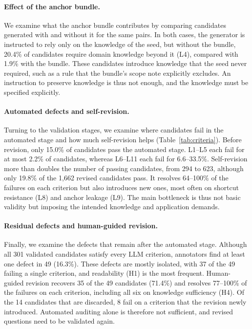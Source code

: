 

\paragraph{Effect of the anchor bundle.}
We examine what the anchor bundle contributes by comparing candidates generated with and without it for the same pairs.
In both cases, the generator is instructed to rely only on the knowledge of the seed, but without the bundle, 20.4\% of candidates require domain knowledge beyond it (L4), compared with 1.9\% with the bundle.
These candidates introduce knowledge that the seed never required, such as a rule that the bundle's scope note explicitly excludes.
An instruction to preserve knowledge is thus not enough, and the knowledge must be specified explicitly.

\paragraph{Automated defects and self-revision.}
Turning to the validation stages, we examine where candidates fail in the automated stage and how much self-revision helps (Table~\ref{tab:criteria}).
Before revision, only 15.0\% of candidates pass the automated stage.
L1--L5 each fail for at most 2.2\% of candidates, whereas L6--L11 each fail for 6.6--33.5\%. 
Self-revision more than doubles the number of passing candidates, from 294 to 623, although only 19.8\% of the 1,662 revised candidates pass.
It resolves 64--100\% of the failures on each criterion but also introduces new ones, most often on shortcut resistance (L8) and anchor leakage (L9).
The main bottleneck is thus not basic validity but imposing the intended knowledge and application demands.

\paragraph{Residual defects and human-guided revision.}
Finally, we examine the defects that remain after the automated stage.
Although all 301 validated candidates satisfy every LLM criterion, annotators find at least one defect in 49 (16.3\%).
These defects are mostly isolated, with 37 of the 49 failing a single criterion, and readability (H1) is the most frequent.
Human-guided revision recovers 35 of the 49 candidates (71.4\%) and resolves 77--100\% of the failures on each criterion, including all six on knowledge sufficiency (H4).
Of the 14 candidates that are discarded, 8 fail on a criterion that the revision newly introduced.
Automated auditing alone is therefore not sufficient, and revised questions need to be validated again.